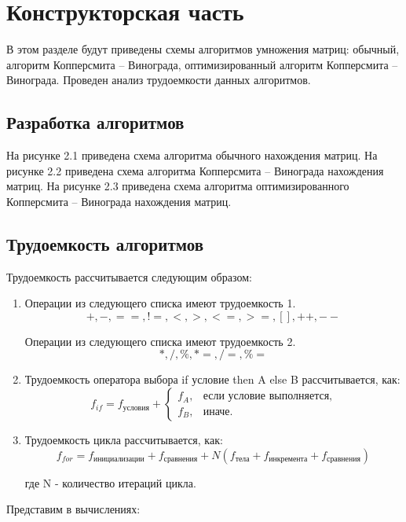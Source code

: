 \chapter{Конструкторская часть}
В этом разделе будут приведены схемы алгоритмов умножения матриц: обычный, алгоритм Копперсмита -- Винограда, оптимизированный алгоритм Копперсмита -- Винограда. Проведен анализ трудоемкости данных алгоритмов.

\section{Разработка алгоритмов}

На рисунке 2.1 приведена схема алгоритма обычного нахождения матриц.
На рисунке 2.2 приведена схема алгоритма Копперсмита -- Винограда нахождения матриц.
На рисунке 2.3 приведена схема алгоритма оптимизированного Копперсмита -- Винограда нахождения матриц.

\newpage

\section{Трудоемкость алгоритмов}
Трудоемкость рассчитывается следующим образом:
\begin{enumerate}
	\item Операции из следующего списка имеют трудоемкость 1.
	\begin{equation}
		+, -, ==, !=, <, >, <=, >=, [], ++, {-}-
	\end{equation}
	
	
	
	Операции из следующего списка имеют трудоемкость 2.
	\begin{equation}
		*, / ,\%, *=, /=, \%=
	\end{equation}
	\item Трудоемкость оператора выбора if условие then A else B рассчитывается, как:
	\begin{equation}
		\label{for:if}
		f_{if} = f_{\text{условия}} +
		\begin{cases}
			f_A, & \text{если условие выполняется,}\\
			f_B, & \text{иначе.}
		\end{cases}
	\end{equation}
	\item Трудоемкость цикла рассчитывается, как:
	\begin{equation}
		\label{for:for}
		f_{for} = f_{\text{инициализации}} + f_{\text{сравнения}} + N(f_{\text{тела}} + f_{\text{инкремента}} + f_{\text{сравнения}})
	\end{equation}
	
	где N - количество итераций цикла.
\end{enumerate}
Представим в вычислениях: 


